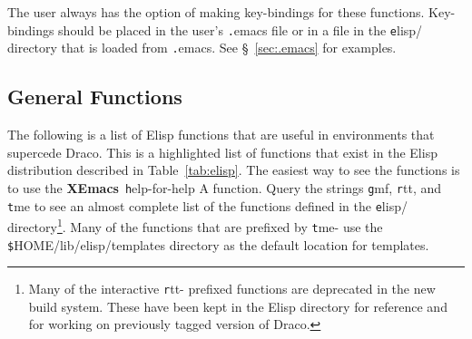 \documentclass[11pt]{nmemo}
\newcommand{\comp}[1]{{\normalfont\texttt#1}}
\newcommand{\draco}{{\normalfont\sffamily Draco}}
\newcommand{\xemacs}{{\normalfont\bfseries XEmacs}}
\begin{document}
The user always has the option of making key-bindings for these
functions.  Key-bindings should be placed in the user's \comp{.emacs}
file or in a file in the \comp{elisp/} directory that is loaded from
\comp{.emacs}.  See \S~\ref{sec:.emacs} for examples.

\subsection{General Functions}
\label{sec:gfunc}

The following is a list of Elisp functions that are useful in
environments that supercede \draco.  This is a highlighted list of
functions that exist in the Elisp distribution described in
Table~\ref{tab:elisp}.  The easiest way to see the functions is to use
the \xemacs\ \comp{help-for-help A} function.  Query the strings
\comp{gmf}, \comp{rtt}, and \comp{tme} to see an almost complete list
of the functions defined in the \comp{elisp/} directory\footnote{Many
  of the interactive \comp{rtt-} prefixed functions are deprecated in
  the new build system.  These have been kept in the Elisp directory
  for reference and for working on previously tagged version of
  \draco.}.  Many of the functions that are prefixed by \comp{tme-}
use the \comp{\$HOME/lib/elisp/templates} directory as the default
location for templates.
\end{document}
